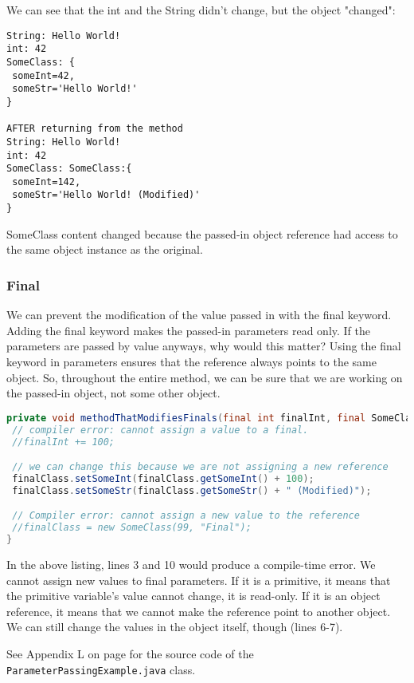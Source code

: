 We can see that the int and the String didn't change, but the object "changed":

\begin{lstlisting}
String: Hello World!
int: 42
SomeClass: {
 someInt=42,
 someStr='Hello World!'
}

AFTER returning from the method
String: Hello World!
int: 42
SomeClass: SomeClass:{
 someInt=142,
 someStr='Hello World! (Modified)'
}
\end{lstlisting}

SomeClass content changed because the passed-in object reference had access to the same object instance as the original.

\subsubsection{Final}
We can prevent the modification of the value passed in with the final keyword. Adding the final keyword makes the passed-in parameters read only. If the parameters are passed by value anyways, why would this matter? Using the final keyword in parameters ensures that the reference always points to the same object. So, throughout the entire method, we can be sure that we are working on the passed-in object, not some other object.
\begin{lstlisting}[language=Java]
private void methodThatModifiesFinals(final int finalInt, final SomeClass finalClass) {
 // compiler error: cannot assign a value to a final.
 //finalInt += 100;

 // we can change this because we are not assigning a new reference
 finalClass.setSomeInt(finalClass.getSomeInt() + 100);
 finalClass.setSomeStr(finalClass.getSomeStr() + " (Modified)");

 // Compiler error: cannot assign a new value to the reference
 //finalClass = new SomeClass(99, "Final");
}
\end{lstlisting}

In the above listing, lines 3 and 10 would produce a compile-time error. We cannot assign new values to final parameters. If it is a primitive, it means that the primitive variable's value cannot change, it is read-only. If it is an object reference, it means that we cannot make the reference point to another object. We can still change the values in the object itself, though (lines 6-7). 

See Appendix L on page \pageref{App:AppendixL} for the source code of the \texttt{ParameterPassingExample.java} class.